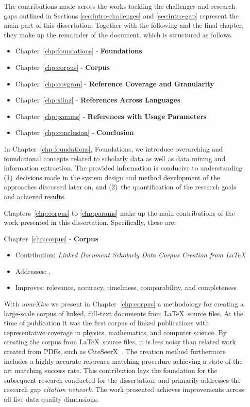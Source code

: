 The contributions made across the works tackling the challenges and research gaps outlined in Sections \ref{sec:intro-challenges} and \ref{sec:intro-gap} represent the main part of this dissertation. Together with the following and the final chapter, they make up the remainder of the document, which is structured as follows.

\begin{itemize}
    \item Chapter~\ref{chp:foundations} - \textbf{Foundations}
    \item Chapter~\ref{chp:corpus} - \textbf{Corpus}
    \item Chapter~\ref{chp:covgran} - \textbf{Reference Coverage and Granularity}
    \item Chapter~\ref{chp:xling} - \textbf{References Across Languages}
    \item Chapter~\ref{chp:params} - \textbf{References with Usage Parameters}
    \item Chapter~\ref{chp:conclusion} - \textbf{Conclusion}
\end{itemize}


In Chapter~\ref{chp:foundations}, Foundations, we introduce overarching and foundational concepts related to scholarly data as well as data mining and information extraction. The provided information is conducive to understanding (1)~decisions made in the system design and method development of the approaches discussed later on, and (2)~the quantification of the research goals and achieved results.

Chapters~\ref{chp:corpus} to \ref{chp:params} make up the main contributions of the work presented in this dissertation. Specifically, these are:

Chapter~\ref{chp:corpus} - \textbf{Corpus}
\begin{itemize}
    \setlength\itemsep{-0.5em}
    \item Contribution: \textit{Linked Document Scholarly Data Corpus Creation from \LaTeX}
    \item Addresses: , 
    \item Improves: relevance, accuracy, timeliness, comparability, and completeness
\end{itemize}
With \emph{unarXive} we present in Chapter~\ref{chp:corpus} a methodology for creating a large-scale corpus of linked, full-text documents from \LaTeX\ source files. At the time of publication it was the first corpus of linked publications with representative coverage in physics, mathematics, and computer science. By creating the corpus from \LaTeX\ source files, it is less noisy than related work created from PDFs, such as CiteSeerX~\cite{Wu2015}. The creation method furthermore includes a highly accurate reference matching procedure achieving a state-of-the-art matching success rate.
This contribution lays the foundation for the subsequent research conducted for the dissertation, and primarily addresses the research gap \emph{citation network}.
The work presented achieves improvements across all five data quality dimensions.


